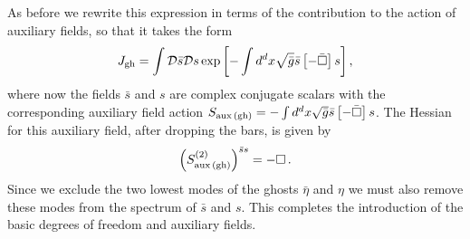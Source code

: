 \documentclass[notitlepage,eqsecnum,bm,amsmath,preprintnumbers,superscriptaddress,nofootinbib,aps,11pt]{revtex4-1}
\begin{document}
As before we rewrite this expression in terms of the contribution to the action of auxiliary fields, so that it takes the form 
\begin{equation}
J_{\rm gh}=\int\mathcal{D}\bar s\mathcal{D} s\exp\left[-\int d^dx\sqrt{\bar g}\bar s\left[-\bar\Box\right] s\right],
\end{equation}
where now the fields $\bar s$ and $s$ are complex conjugate scalars with the corresponding auxiliary field action $ S_{\rm aux \,{\rm (gh)}} =  -\int d^dx\sqrt{\bar g}\bar s\left[-\bar\Box\right] s$. The  Hessian for this auxiliary field, after dropping the bars, is given by
\begin{equation} \label{bare_auxgh_hessian}
\left(S^{(2)}_{\rm  aux\, (gh) }  \right)^{\bar s s}=-\Box\,.
\end{equation}
Since we exclude the two lowest modes of the ghosts $\bar{\eta}$ and $\eta$ we must also remove these modes from the spectrum of $\bar{s}$ and $s$.
This completes the introduction of the basic degrees of freedom and auxiliary fields. 
\end{document}
